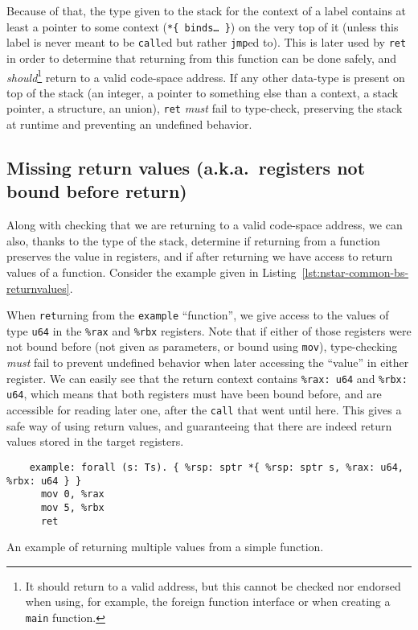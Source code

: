 Because of that, the type given to the stack for the context of a label contains at least a pointer to some context (\texttt{*\{ binds\ldots\ \}}) on the very top of it (unless this label is never meant to be \texttt{call}ed but rather \texttt{jmp}ed to).
This is later used by \texttt{ret} in order to determine that returning from this function can be done safely, and \textit{should}\footnote{It should return to a valid address, but this cannot be checked nor endorsed when using, for example, the foreign function interface or when creating a \texttt{main} function.} return to a valid code-space address.
If any other data-type is present on top of the stack (an integer, a pointer to something else than a context, a stack pointer, a structure, an union), \texttt{ret} \textit{must} fail to type-check, preserving the stack at runtime and preventing an undefined behavior.

\subsection{Missing return values (a.k.a.\ registers not bound before return)}\label{subsec:nstar-common-bs-unboundregs}

Along with checking that we are returning to a valid code-space address, we can also, thanks to the type of the stack, determine if returning from a function preserves the value in registers, and if after returning we have access to return values of a function.
Consider the example given in Listing~\ref{lst:nstar-common-bs-returnvalues}.

When \texttt{ret}urning from the \texttt{example} ``function'', we give access to the values of type \texttt{u64} in the \texttt{\%rax} and \texttt{\%rbx} registers.
Note that if either of those registers were not bound before (not given as parameters, or bound using \texttt{mov}), type-checking \textit{must} fail to prevent undefined behavior when later accessing the ``value'' in either register.
We can easily see that the return context contains \texttt{\%rax: u64} and \texttt{\%rbx: u64}, which means that both registers must have been bound before, and are accessible for reading later one, after the \texttt{call} that went until here.
This gives a safe way of using return values, and guaranteeing that there are indeed return values stored in the target registers.

\begin{listing}[htb]
  \centering
  \begin{minipage}{0.90\textwidth}
    \begin{verbatim}
    example: forall (s: Ts). { %rsp: sptr *{ %rsp: sptr s, %rax: u64, %rbx: u64 } }
      mov 0, %rax
      mov 5, %rbx
      ret
    \end{verbatim}
  \end{minipage}
  \caption{An example of returning multiple values from a simple function.}
  \label{lst:nstar-common-bs-returnvalues}
\end{listing}

